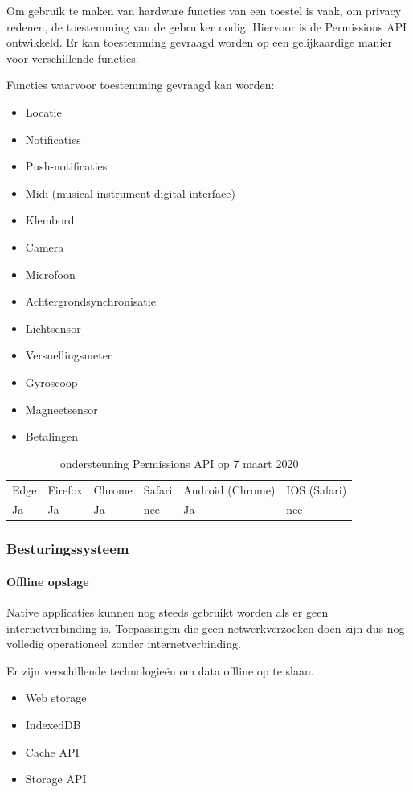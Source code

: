Om gebruik te maken van hardware functies van een toestel is vaak, om privacy redenen, de toestemming van de gebruiker nodig. Hiervoor is de Permissions API \autocite{Caceres2017} ontwikkeld. Er kan toestemming gevraagd worden op een gelijkaardige manier voor verschillende functies.

Functies waarvoor toestemming gevraagd kan worden:
 \begin{itemize}
	\item	Locatie
	\item	Notificaties
	\item	Push-notificaties
	\item	Midi (musical instrument digital interface)
	\item	Klembord
	\item	Camera
	\item	Microfoon
	\item	Achtergrondsynchronisatie
	\item	Lichtsensor
	\item	Versnellingsmeter
	\item	Gyroscoop
	\item	Magneetsensor
	\item	Betalingen
\end{itemize}

	\begin{table}[H]
		\centering
		\begin{tabular}{llllll}
			Edge & Firefox & Chrome & Safari & Android (Chrome) & IOS (Safari) \\
			Ja   & Ja      &  Ja     & nee     & Ja               & nee          
		\end{tabular}	
		\caption{ondersteuning Permissions API op 7 maart 2020}
	\end{table}
	

\subsubsection{Besturingssysteem}
\paragraph{Offline opslage}
Native applicaties kunnen nog steeds gebruikt worden als er geen internetverbinding is. Toepassingen die geen netwerkverzoeken doen zijn dus nog volledig operationeel zonder internetverbinding. 

Er zijn verschillende technologieën om data offline op te slaan. 

 \begin{itemize}
	\item	Web storage
	\item	IndexedDB
	\item	Cache API
	\item	Storage API
\end{itemize}


